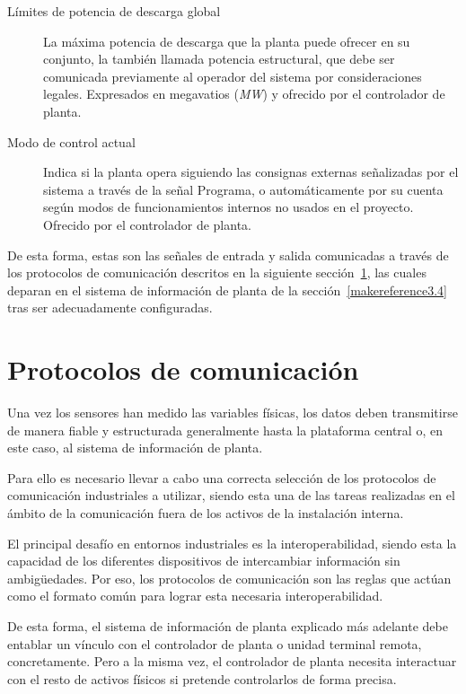 \begin{description}
\item[Límites de potencia de descarga global] La máxima potencia de descarga que la planta puede ofrecer en su conjunto, la también llamada potencia estructural, que debe ser comunicada previamente al operador del sistema por consideraciones legales. Expresados en megavatios (\textit{MW}) y ofrecido por el controlador de planta.

\item[Modo de control actual] Indica si la planta opera siguiendo las consignas externas señalizadas por el sistema a través de la señal Programa, o automáticamente por su cuenta según modos de funcionamientos internos no usados en el proyecto. Ofrecido por el controlador de planta.

\end{description}

De esta forma, estas son las señales de entrada y salida comunicadas a través de los protocolos de comunicación descritos en la siguiente sección~\ref{makereference3.3}, las cuales deparan en el sistema de información de planta de la sección~\ref{makereference3.4} tras ser adecuadamente configuradas.

\section{Protocolos de comunicación}
\label{makereference3.3}

Una vez los sensores han medido las variables físicas, los datos deben transmitirse de manera fiable y estructurada generalmente hasta la plataforma central o, en este caso, al sistema de información de planta.

Para ello es necesario llevar a cabo una correcta selección de los protocolos de comunicación industriales a utilizar, siendo esta una de las tareas realizadas en el ámbito de la comunicación fuera de los activos de la instalación interna.

El principal desafío en entornos industriales es la interoperabilidad, siendo esta la capacidad de los diferentes dispositivos de intercambiar información sin ambigüedades. Por eso, los protocolos de comunicación son las reglas que actúan como el formato común para lograr esta necesaria interoperabilidad.

De esta forma, el sistema de información de planta explicado más adelante debe entablar un vínculo con el controlador de planta o unidad terminal remota, concretamente. Pero a la misma vez, el controlador de planta necesita interactuar con el resto de activos físicos si pretende controlarlos de forma precisa.


